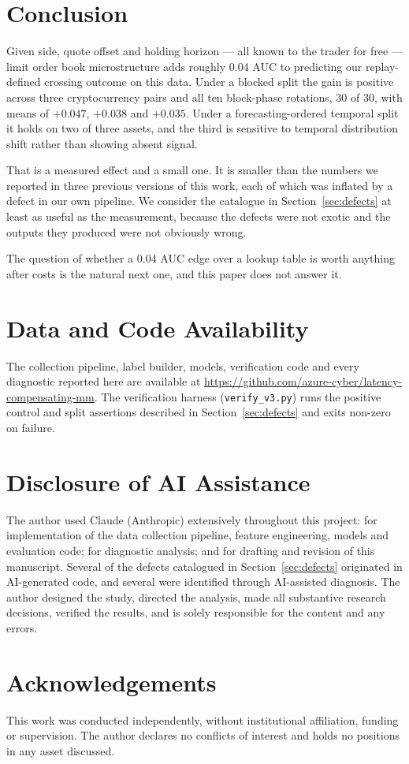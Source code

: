 \documentclass[11pt]{article}
\begin{document}
\section{Conclusion}

Given side, quote offset and holding horizon --- all known to the trader for
free --- limit order book microstructure adds roughly 0.04 AUC to predicting
our replay-defined crossing outcome on this data. Under a blocked split the gain is positive across three cryptocurrency pairs
and all ten block-phase rotations, 30 of 30, with means of $+0.047$, $+0.038$
and $+0.035$. Under a forecasting-ordered temporal split
it holds on two of three assets, and the third is sensitive to temporal
distribution shift rather than showing absent signal.

That is a measured effect and a small one. It is smaller than the numbers we
reported in three previous versions of this work, each of which was inflated by
a defect in our own pipeline. We consider the catalogue in
Section~\ref{sec:defects} at least as useful as the measurement, because the
defects were not exotic and the outputs they produced were not obviously wrong.

The question of whether a 0.04 AUC edge over a lookup table is worth anything
after costs is the natural next one, and this paper does not answer it.

\section*{Data and Code Availability}

The collection pipeline, label builder, models, verification code and every
diagnostic reported here are available at
\url{https://github.com/azure-cyber/latency-compensating-mm}. The verification
harness (\texttt{verify\_v3.py}) runs the positive control and split assertions
described in Section~\ref{sec:defects} and exits non-zero on failure.

\section*{Disclosure of AI Assistance}

The author used Claude (Anthropic) extensively throughout this project: for
implementation of the data collection pipeline, feature engineering, models and
evaluation code; for diagnostic analysis; and for drafting and revision of this
manuscript. Several of the defects catalogued in Section~\ref{sec:defects}
originated in AI-generated code, and several were identified through
AI-assisted diagnosis. The author designed the study, directed the analysis,
made all substantive research decisions, verified the results, and is solely
responsible for the content and any errors.

\section*{Acknowledgements}

This work was conducted independently, without institutional affiliation,
funding or supervision. The author declares no conflicts of interest and holds
no positions in any asset discussed.


\end{document}
